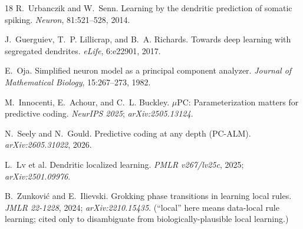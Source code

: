 \documentclass[11pt]{article}
\begin{document}
\begin{thebibliography}{18}
R.~Urbanczik and W.~Senn.
\newblock Learning by the dendritic prediction of somatic spiking.
\newblock \emph{Neuron}, 81:521--528, 2014.

J.~Guerguiev, T.~P. Lillicrap, and B.~A. Richards.
\newblock Towards deep learning with segregated dendrites.
\newblock \emph{eLife}, 6:e22901, 2017.

E.~Oja.
\newblock Simplified neuron model as a principal component analyzer.
\newblock \emph{Journal of Mathematical Biology}, 15:267--273, 1982.

M.~Innocenti, E.~Achour, and C.~L. Buckley.
\newblock $\mu$PC: Parameterization matters for predictive coding.
\newblock \emph{NeurIPS 2025}; \emph{arXiv:2505.13124}.

N.~Seely and N.~Gould.
\newblock Predictive coding at any depth (PC-ALM).
\newblock \emph{arXiv:2605.31022}, 2026.

L.~Lv et al.
\newblock Dendritic localized learning.
\newblock \emph{PMLR v267/lv25c}, 2025; \emph{arXiv:2501.09976}.

B.~Zunkovi{\'c} and E.~Ilievski.
\newblock Grokking phase transitions in learning local rules.
\newblock \emph{JMLR 22-1228}, 2024; \emph{arXiv:2210.15435}.
\newblock (``local'' here means data-local rule learning; cited only to disambiguate from biologically-plausible local learning.)

\end{thebibliography}
\end{document}
